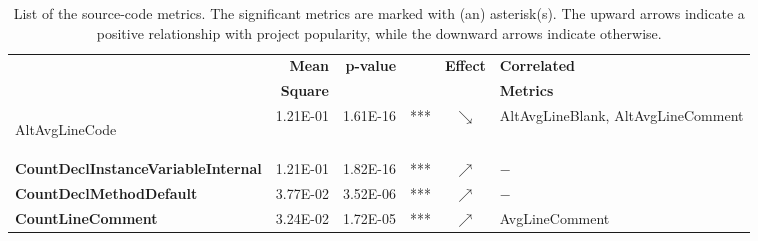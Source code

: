 \begin{sidewaystable}
	\scriptsize
	\tabcolsep=0.1cm
\centering
\caption{List of the source-code metrics. The significant metrics are marked with (an) asterisk(s). The upward arrows indicate a positive relationship with project popularity, while the downward arrows indicate otherwise.}
\label{table:RQ3}
	\begin{tabularx}{\columnwidth}{>{\bfseries}lrrlcl}
	\toprule
	\multirow{2}{*}{Metric} & \textbf{Mean}  & \multirow{2}{*}{\textbf{p-value}}  &     & \multirow{2}{*}{\textbf{Effect}}     &\textbf{Correlated}\\
	&\textbf{Square}&& &&\textbf{Metrics} \\
	\midrule	\midrule
	
AltAvgLineCode                             & 1.21E-01 & 1.61E-16 & *** & $\searrow$ & AltAvgLineBlank, AltAvgLineComment                                                                                                                                                                                                                                                                                                                              \\
CountDeclInstanceVariableInternal & 1.21E-01 & 1.82E-16
 & *** & $\nearrow$ &             $-$                                                                                                                                                                                                                                                                                                                                                     \\
CountDeclMethodDefault & 3.77E-02 & 3.52E-06
 & *** & $\nearrow$ &               $-$                                                                                                                                                                                                                                                                                                                                                   \\
CountLineComment & 3.24E-02 & 1.72E-05
 & *** & $\nearrow$ & AvgLineComment                                                                                                                                                                                                                                                                                                                                                  \\

\end{tabularx}
\end{sidewaystable}
